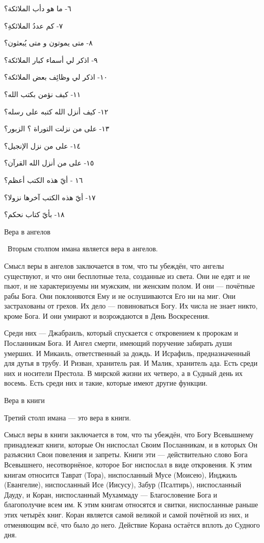 \documentclass[a5paper]{article}
\begin{document}
٦- ما هو دأب الملائكة؟

٧- كم عددُ الملائكةِ؟

٨- متى يموتون و متى يُبعثون؟

٩- اذكر لي أسماء كبار الملائكة؟

١٠- اذكر لي وظائِف بعض الملائكة؟

١١- كيف نؤمن بكتب الله؟

١٢- كيف أنزل الله كتبه على رسله؟

١٣- على من نزلت التوراة ؟ الزبور؟

١٤- على من نزل الإنجيل؟

١٥- على من أنزل الله القرآن؟

١٦ - أيّ هذه الكتب أعظم؟

١٧- أيّ هذه الكتب آخرها نزولا؟

١٨- بأيّ كتاب نحكم؟

Вера в ангелов

\ Вторым столпом имана является вера в ангелов.

Смысл веры в ангелов заключается в том, что ты убеждён, что ангелы существуют, и что они бесплотные тела, созданные из света. Они не едят и не пьют, и не характеризуемы ни мужским, ни женским полом. И они — почётные рабы Бога. Они поклоняются Ему и не ослушиваются Его ни на миг. Они застрахованы от грехов. Их де­ло — повиноваться Богу. Их числа не знает никто, кроме Бога. И они умирают и возрождаются в День Воскресения.

Среди них — Джабраиль, который спускается с откровением к пророкам и Посланникам Бога. И Ангел смерти, имеющий поручение забирать души умерших. И Микаиль, ответственный за дождь. И Исрафиль, предназначенный для дутья в трубу. И Ризван, хранитель рая. И Малик, хранитель ада. Есть среди них и носители Престола. В мирской жизни их четверо, а в Судный день их восемь. Есть среди них и такие, которые имеют другие функции.

Вера в книги

Третий столп имана — это вера в книги.

Смысл веры в книги заключается в том, что ты убеждён, что Богу Всевышнему принадлежат книги, которые Он ниспослал Своим Посланникам, и в которых Он разъяснил Свои повеления и запреты. Книги эти — действительно слово Бога Всевышнего, несотворнёное, которое Бог ниспослал в виде откровения. К этим книгам относится Таврат (Тора), ниспосланный Мусе (Моисею), Инджиль (Евангелие), ниспосланный Исе (Иисусу), Забур (Псалтирь), ниспосланный Дауду, и Коран, ниспосланный Мухаммаду — Благословение Бога и благополучие всем им. К этим книгам относятся и свитки, ниспосланные раньше этих четырёх книг. Коран является самой великой и самой почётной из них, и отменяющим всё, что было до него. Действие Корана остаётся вплоть до Судного дня.
\end{document}
